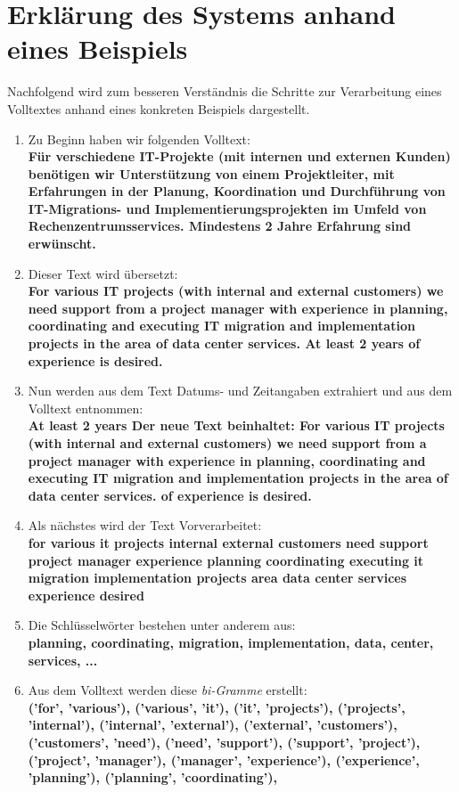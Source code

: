 \section{Erklärung des Systems anhand eines Beispiels}
Nachfolgend wird zum besseren Verständnis die Schritte zur Verarbeitung eines Volltextes anhand eines konkreten Beispiels dargestellt.\\
\begin{enumerate}
	\item Zu Beginn haben wir folgenden Volltext:\\ \textbf{Für verschiedene IT-Projekte (mit internen und externen Kunden) benötigen wir Unterstützung von einem Projektleiter, mit Erfahrungen in der Planung, Koordination und Durchführung von IT-Migrations- und Implementierungsprojekten im Umfeld von Rechenzentrumsservices. Mindestens 2 Jahre Erfahrung sind erwünscht.}
	\item Dieser Text wird übersetzt:\\ \textbf{For various IT projects (with internal and external customers) we need support from a project manager with experience in planning, coordinating and executing IT migration and implementation projects in the area of data center services. At least 2 years of experience is desired.}
	\item Nun werden aus dem Text Datums- und Zeitangaben extrahiert und aus dem Volltext entnommen:\\ \textbf{At least 2 years \grqq Der neue Text beinhaltet: \grqq For various IT projects (with internal and external customers) we need support from a project manager with experience in planning, coordinating and executing IT migration and implementation projects in the area of data center services. of experience is desired.}
	\item Als nächstes wird der Text Vorverarbeitet:\\ \textbf{for various it projects internal external customers need support project manager experience planning coordinating executing it migration implementation projects area data center services experience desired}
	\item Die Schlüsselwörter bestehen unter anderem aus:\\ \textbf{planning, coordinating, migration, implementation, data, center, services, ...}
	\item Aus dem Volltext werden diese \emph{bi-Gramme} erstellt:\\ \textbf{('for', 'various'), ('various', 'it'), ('it', 'projects'), ('projects', 'internal'), ('internal', 'external'), ('external', 'customers'), ('customers', 'need'), ('need', 'support'), ('support', 'project'), ('project', 'manager'), ('manager', 'experience'), ('experience', 'planning'), ('planning', 'coordinating'),
}
\end{enumerate}
